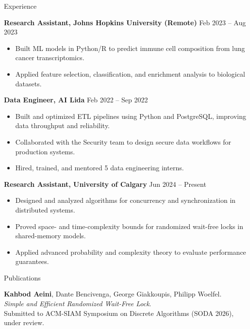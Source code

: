 \documentclass{resume}
\begin{document}
\begin{rSection}{Experience}

{\bf Research Assistant, Johns Hopkins University (Remote)} \hfill Feb 2023 -- Aug 2023 \\
\begin{itemize}
  \item Built ML models in Python/R to predict immune cell composition from lung cancer transcriptomics.
  \item Applied feature selection, classification, and enrichment analysis to biological datasets.
\end{itemize}


{\bf Data Engineer, AI Lida} \hfill Feb 2022 -- Sep 2022 \\
\begin{itemize}
  \item Built and optimized ETL pipelines using Python and PostgreSQL, improving data throughput and reliability.
  \item Collaborated with the Security team to design secure data workflows for production systems.
  \item Hired, trained, and mentored 5 data engineering interns.
\end{itemize}

{\bf Research Assistant, University of Calgary} \hfill Jun 2024 -- Present \\
\begin{itemize}
  \item Designed and analyzed algorithms for concurrency and synchronization in distributed systems.
  \item Proved space- and time-complexity bounds for randomized wait-free locks in shared-memory models.
  \item Applied advanced probability and complexity theory to evaluate performance guarantees.
\end{itemize}

\end{rSection}



\begin{rSection}{Publications}

{\bf Kahbod Aeini}, Dante Bencivenga, George Giakkoupis, Philipp Woelfel. \\
\textit{Simple and Efficient Randomized Wait-Free Lock}. \\
Submitted to ACM-SIAM Symposium on Discrete Algorithms (SODA 2026), under review.

\end{rSection}
\end{document}
